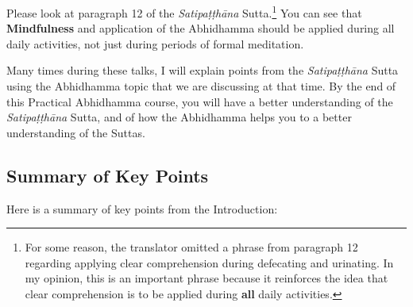 Please look at paragraph 12 of the \textit{Satipaṭṭhāna} Sutta.\footnote{For some reason, the translator omitted a phrase from paragraph 12 regarding applying clear comprehension during defecating and urinating. In my opinion, this is an important phrase because it reinforces the idea that clear comprehension is to be applied during \textbf{all} daily activities.} You can see that \textbf{Mindfulness} and application of the Abhidhamma should be applied during all daily activities, not just during periods of formal meditation.

Many times during these talks, I will explain points from the \textit{Satipaṭṭhāna} Sutta using the Abhidhamma topic that we are discussing at that time. By the end of this Practical Abhidhamma course, you will have a better understanding of the \textit{Satipaṭṭhāna} Sutta, and of how the Abhidhamma helps you to a better understanding of the Suttas.

\subsection*{Summary of Key Points}

Here is a summary of key points from the Introduction:


